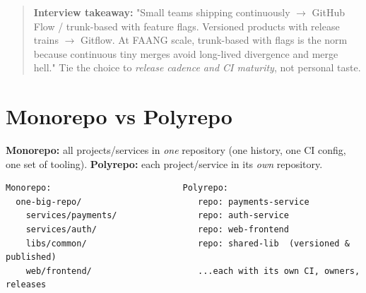 \documentclass[11pt]{article}
\begin{document}
\begin{quote}
\textbf{Interview takeaway:} "Small teams shipping continuously \(\rightarrow\) GitHub Flow / trunk-based with feature flags. Versioned products with release trains \(\rightarrow\) Gitflow. At FAANG scale, trunk-based with flags is the norm because continuous tiny merges avoid long-lived divergence and merge hell." Tie the choice to \emph{release cadence and CI maturity}, not personal taste.
\end{quote}

\section{Monorepo vs Polyrepo}\label{monorepo-vs-polyrepo}

\textbf{Monorepo:} all projects/services in \emph{one} repository (one history, one CI config, one set of tooling). \textbf{Polyrepo:} each project/service in its \emph{own} repository.

\setcodelang{}

\begin{verbatim}
Monorepo:                          Polyrepo:
  one-big-repo/                       repo: payments-service
    services/payments/                repo: auth-service
    services/auth/                    repo: web-frontend
    libs/common/                      repo: shared-lib  (versioned & published)
    web/frontend/                     ...each with its own CI, owners, releases
\end{verbatim}
\end{document}
